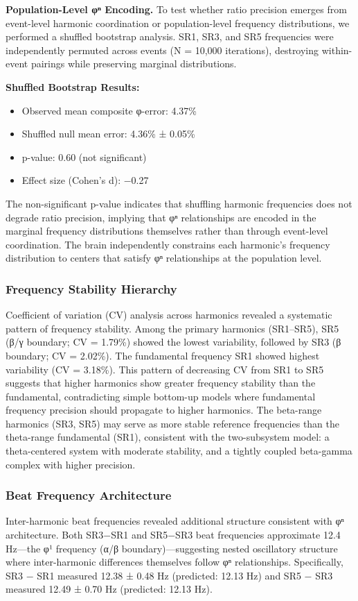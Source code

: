 \documentclass[11pt,a4paper]{article}
\begin{document}
\textbf{Population-Level φⁿ Encoding.}
To test whether ratio precision emerges from event-level harmonic coordination or population-level frequency distributions, we performed a shuffled bootstrap analysis. SR1, SR3, and SR5 frequencies were independently permuted across events (N = 10,000 iterations), destroying within-event pairings while preserving marginal distributions.

\textbf{Shuffled Bootstrap Results:}
\begin{itemize}
\item Observed mean composite φ-error: 4.37\%
\item Shuffled null mean error: 4.36\% ± 0.05\%
\item p-value: 0.60 (not significant)
\item Effect size (Cohen's d): −0.27
\end{itemize}

The non-significant p-value indicates that shuffling harmonic frequencies does not degrade ratio precision, implying that φⁿ relationships are encoded in the marginal frequency distributions themselves rather than through event-level coordination. The brain independently constrains each harmonic's frequency distribution to centers that satisfy φⁿ relationships at the population level.

\subsubsection{Frequency Stability Hierarchy}
Coefficient of variation (CV) analysis across harmonics revealed a systematic pattern of frequency stability. Among the primary harmonics (SR1–SR5), SR5 (β/γ boundary; CV = 1.79\%) showed the lowest variability, followed by SR3 (β boundary; CV = 2.02\%). The fundamental frequency SR1 showed highest variability (CV = 3.18\%). This pattern of decreasing CV from SR1 to SR5 suggests that higher harmonics show greater frequency stability than the fundamental, contradicting simple bottom-up models where fundamental frequency precision should propagate to higher harmonics. The beta-range harmonics (SR3, SR5) may serve as more stable reference frequencies than the theta-range fundamental (SR1), consistent with the two-subsystem model: a theta-centered system with moderate stability, and a tightly coupled beta-gamma complex with higher precision.

\subsubsection{Beat Frequency Architecture}
Inter-harmonic beat frequencies revealed additional structure consistent with φⁿ architecture. Both SR3−SR1 and SR5−SR3 beat frequencies approximate 12.4 Hz—the φ¹ frequency (α/β boundary)—suggesting nested oscillatory structure where inter-harmonic differences themselves follow φⁿ relationships. Specifically, SR3 − SR1 measured 12.38 ± 0.48 Hz (predicted: 12.13 Hz) and SR5 − SR3 measured 12.49 ± 0.70 Hz (predicted: 12.13 Hz).
\end{document}
